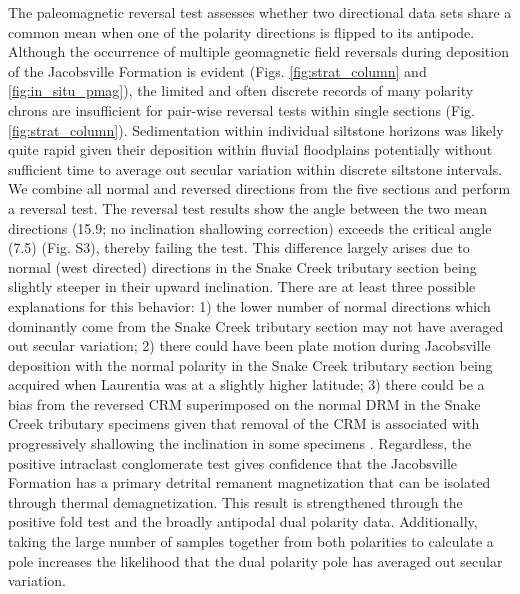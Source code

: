 \documentclass[draft]{agujournal2019}
\begin{document}
The paleomagnetic reversal test assesses whether two directional data sets share a common mean when one of the polarity directions is flipped to its antipode. Although the occurrence of multiple geomagnetic field reversals during deposition of the Jacobsville Formation is evident (Figs. \ref{fig:strat_column} and \ref{fig:in_situ_pmag}), the limited and often discrete records of many polarity chrons are insufficient for pair-wise reversal tests within single sections (Fig. \ref{fig:strat_column}). Sedimentation within individual siltstone horizons was likely quite rapid given their deposition within fluvial floodplains potentially without sufficient time to average out secular variation within discrete siltstone intervals. We combine all normal and reversed directions from the five sections and perform a reversal test. The  reversal test results show the angle between the two mean directions (15.9\textdegree; no inclination shallowing correction) exceeds the critical angle (7.5\textdegree) (Fig. S3), thereby failing the test. This difference largely arises due to normal (west directed) directions in the Snake Creek tributary section being slightly steeper in their upward inclination. There are at least three possible explanations for this behavior: 1) the lower number of normal directions which dominantly come from the Snake Creek tributary section may not have averaged out secular variation; 2) there could have been plate motion during Jacobsville deposition with the normal polarity in the Snake Creek tributary section being acquired when Laurentia was at a slightly higher latitude; 3) there could be a bias from the reversed CRM superimposed on the normal DRM in the Snake Creek tributary specimens given that removal of the CRM is associated with progressively shallowing the inclination in some specimens \cite{Cox1960a, Scott1996a}. Regardless, the positive intraclast conglomerate test gives confidence that the Jacobsville Formation has a primary detrital remanent magnetization that can be isolated through thermal demagnetization. This result is strengthened through the positive fold test and the broadly antipodal dual polarity data. Additionally, taking the large number of samples together from both polarities to calculate a pole increases the likelihood that the dual polarity pole has averaged out secular variation.
\end{document}
